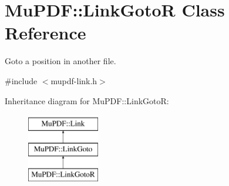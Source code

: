 \hypertarget{class_mu_p_d_f_1_1_link_goto_r}{\section{Mu\-P\-D\-F\-:\-:Link\-Goto\-R Class Reference}
\label{class_mu_p_d_f_1_1_link_goto_r}
}


Goto a position in another file.  




{\ttfamily \#include $<$mupdf-\/link.\-h$>$}

Inheritance diagram for Mu\-P\-D\-F\-:\-:Link\-Goto\-R\-:\begin{figure}[H]
\begin{center}
\leavevmode
\includegraphics[height=3.000000cm]{class_mu_p_d_f_1_1_link_goto_r}
\end{center}
\end{figure}
